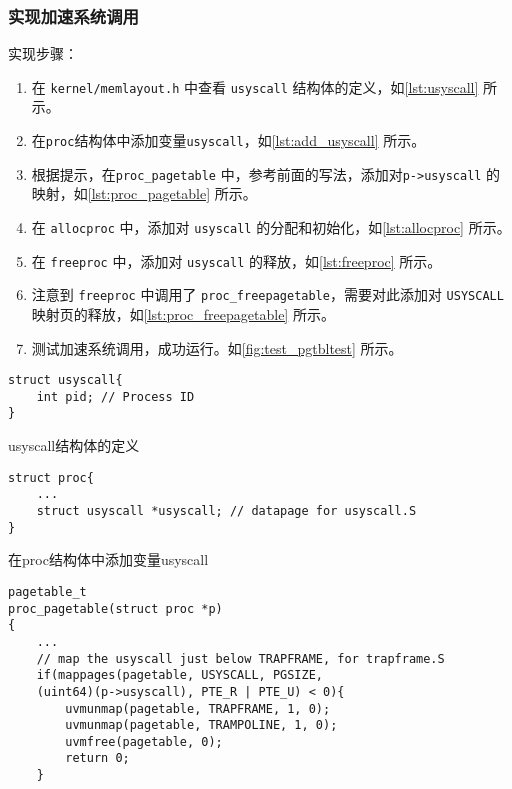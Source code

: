 {\subsubsection{实现加速系统调用}

实现步骤：
\begin{enumerate}
	\item 在 \texttt{kernel/memlayout.h} 中查看 \texttt{usyscall} 结构体的定义，如\cref{lst:usyscall} 所示。
	\item 在\texttt{proc}结构体中添加变量\texttt{usyscall}，如\cref{lst:add_usyscall} 所示。
	\item 根据提示，在\texttt{proc\_pagetable} 中，参考前面的写法，添加对\texttt{p->usyscall} 的映射，如\cref{lst:proc_pagetable} 所示。
	\item 在 \texttt{allocproc} 中，添加对 \texttt{usyscall} 的分配和初始化，如\cref{lst:allocproc} 所示。
	\item 在 \texttt{freeproc} 中，添加对 \texttt{usyscall} 的释放，如\cref{lst:freeproc} 所示。
	\item 注意到 \texttt{freeproc} 中调用了 \texttt{proc\_freepagetable}，需要对此添加对 \texttt{USYSCALL} 映射页的释放，如\cref{lst:proc_freepagetable} 所示。
	\item 测试加速系统调用，成功运行。如\cref{fig:test_pgtbltest} 所示。
\end{enumerate}

\begin{listing}[!htb]
	\begin{verbatim}
struct usyscall{
    int pid; // Process ID
}
	\end{verbatim}
	\caption{usyscall结构体的定义}\label{lst:usyscall}
\end{listing}

\begin{listing}[!htb]
	\begin{verbatim}
struct proc{
    ...
    struct usyscall *usyscall; // datapage for usyscall.S
}
	\end{verbatim}
	\caption{在proc结构体中添加变量usyscall}\label{lst:add_usyscall}
\end{listing}                                    

\begin{listing}[!htb]
	\begin{verbatim}
pagetable_t
proc_pagetable(struct proc *p)
{
    ...
    // map the usyscall just below TRAPFRAME, for trapframe.S
    if(mappages(pagetable, USYSCALL, PGSIZE,
    (uint64)(p->usyscall), PTE_R | PTE_U) < 0){
        uvmunmap(pagetable, TRAPFRAME, 1, 0);
        uvmunmap(pagetable, TRAMPOLINE, 1, 0);
        uvmfree(pagetable, 0);
        return 0;
    }


\end{verbatim}
\end{listing}}
